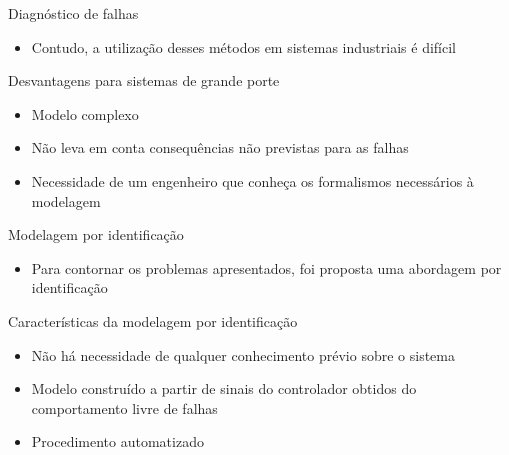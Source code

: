 \documentclass[xcolor=x11names,compress,framenumber]{beamer}
\renewcommand{\(}{\begin{columns}}
\renewcommand{\)}{\end{columns}}
\newcommand{\<}[1]{\begin{column}{#1}}
\renewcommand{\>}{\end{column}}
\newcommand{\bulletpoint}[1]{\begin{itemize}
		\item #1
\end{itemize}}
\begin{document}

\begin{frame}{Diagnóstico de falhas}
\begin{block}{}
\bulletpoint{Contudo, a utilização desses métodos em sistemas industriais é difícil}
\end{block}
\begin{block}{Desvantagens para sistemas de grande porte}
\begin{itemize}
\item Modelo complexo
\item Não leva em conta consequências não previstas para as falhas 
\item Necessidade de um engenheiro que conheça os formalismos necessários à modelagem
\end{itemize}
\end{block}
\end{frame}

\begin{frame}{Modelagem por identificação}
\begin{block}{}
\bulletpoint{Para contornar os problemas apresentados, foi proposta uma abordagem por identificação}  
\end{block}
\begin{block}{Características da modelagem por identificação}
\begin{itemize}
\item Não há necessidade de qualquer conhecimento prévio sobre o sistema
\item Modelo construído a partir de sinais do controlador obtidos do comportamento livre de falhas 
\item Procedimento automatizado
\end{itemize}
\end{block} 
\end{frame}
\end{document}
